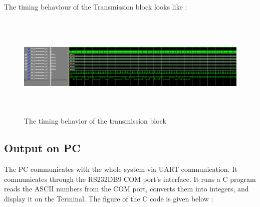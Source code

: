 \documentclass[12pt,a4paper]{article}
\begin{document}
The timing behaviour of the Transmission block looks like :\\

\begin{figure}[H]
\centering
\includegraphics[width=16cm,height=5cm]{transmission.PNG}
\caption{The timing behavior of the transmission block}
\label{The timing behavior of the transmission block}
\end{figure}

\subsection{Output on PC}
The PC communicates with the whole system via UART communication. It communicates through the RS232DB9 COM port’s interface. It runs a C program reads the ASCII numbers from the COM port, converts them into integers, and display it on the Terminal. The figure of the C code is given below :\\
\end{document}
